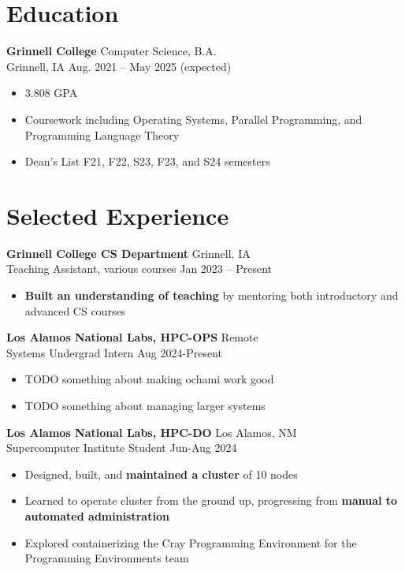 \documentclass[12pt]{article}
\newcommand{\entry}[4]{{{\textbf{#1}}} \hfill #3 \\ #2 \hfill #4}
\begin{document}
\noindent %
\begin{minipage}[t]{0.63\textwidth}

  \section{Education}
  \entry{Grinnell College}{Grinnell, IA}{Computer Science, B.A.}{Aug. 2021 -- May 2025 (expected)}
  \begin{itemize}[noitemsep,rightmargin=0mm,topsep=0pt,leftmargin=.75cm]
    \item 3.808 GPA
    \item Coursework including Operating Systems, Parallel Programming, and Programming Language Theory
    \item Dean's List F21, F22, S23, F23, and S24 semesters
  \end{itemize}
  \vspace{-15pt} %

  \section{Selected Experience}
  \entry{Grinnell College CS Department}{Teaching Assistant, various courses}{Grinnell, IA}{Jan 2023 -- Present}
  \begin{itemize}[noitemsep,rightmargin=0mm,topsep=0pt,leftmargin=.75cm]
    \item {\bf Built an understanding of teaching} by mentoring both introductory and advanced CS courses
  \end{itemize}

  \medskip

  \entry{Los Alamos National Labs, HPC-OPS}{Systems Undergrad Intern}{Remote}{Aug 2024-Present}
  \begin{itemize}[noitemsep,rightmargin=0mm,topsep=0pt,leftmargin=.75cm]
    \item TODO something about making ochami work good %
    \item TODO something about managing larger systems %
  \end{itemize}

  \medskip

  \entry{Los Alamos National Labs, HPC-DO}{Supercomputer Institute Student}{Los Alamos, NM}{Jun-Aug 2024}
  \begin{itemize}[noitemsep,rightmargin=0mm,topsep=0pt,leftmargin=.75cm]
    \item Designed, built, and {\bf maintained a cluster} of 10 nodes
    \item Learned to operate cluster from the ground up, progressing from {\bf manual to automated administration}
    \item Explored containerizing the Cray Programming Environment for the Programming Environments team
  \end{itemize}


\end{minipage}
\end{document}
